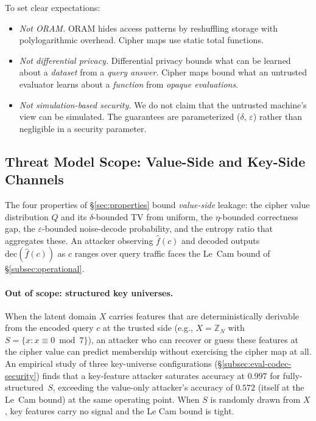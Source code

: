 \documentclass[11pt]{article}
\theoremstyle{definition}
\theoremstyle{plain}
\theoremstyle{remark}
\newcommand{\fhat}{\hat{f}}
\newcommand{\dec}{\mathrm{dec}}
\begin{document}
To set clear expectations:
\begin{itemize}
\item \emph{Not ORAM.}  ORAM hides access patterns by reshuffling storage
    with polylogarithmic overhead.  Cipher maps use static total functions.
\item \emph{Not differential privacy.}  Differential privacy bounds what
    can be learned about a \emph{dataset} from a \emph{query answer}.
    Cipher maps bound what an untrusted evaluator learns about a
    \emph{function} from \emph{opaque evaluations}.
\item \emph{Not simulation-based security.}  We do not claim that the
    untrusted machine's view can be simulated.  The guarantees are
    parameterized ($\delta$, $\varepsilon$) rather than negligible in a
    security parameter.
\end{itemize}

\subsection{Threat Model Scope: Value-Side and Key-Side Channels}
\label{subsec:threat-scope}

The four properties of \S\ref{sec:properties} bound \emph{value-side}
leakage: the cipher value distribution $Q$ and its $\delta$-bounded TV
from uniform, the $\eta$-bounded correctness gap, the
$\varepsilon$-bounded noise-decode probability, and the entropy ratio
that aggregates these.  An attacker observing $\fhat(c)$ and decoded
outputs $\dec(\fhat(c))$ as $c$ ranges over query traffic faces the
Le~Cam bound of \S\ref{subsec:operational}.

\paragraph{Out of scope: structured key universes.}  When the latent
domain $X$ carries features that are deterministically derivable from
the encoded query $c$ at the trusted side (e.g., $X = \mathbb{Z}_N$
with $S = \{x : x \equiv 0 \bmod 7\}$), an attacker who can recover or
guess these features at the cipher value can predict membership
without exercising the cipher map at all.  An empirical study of three
key-universe configurations
(\S\ref{subsec:eval-codec-security}) finds that a key-feature attacker
saturates accuracy at $0.997$ for fully-structured~$S$, exceeding the
value-only attacker's accuracy of $0.572$ (itself at the Le~Cam bound)
at the same operating point.  When
$S$ is randomly drawn from $X$, key features carry no signal and the
Le Cam bound is tight.
\end{document}
